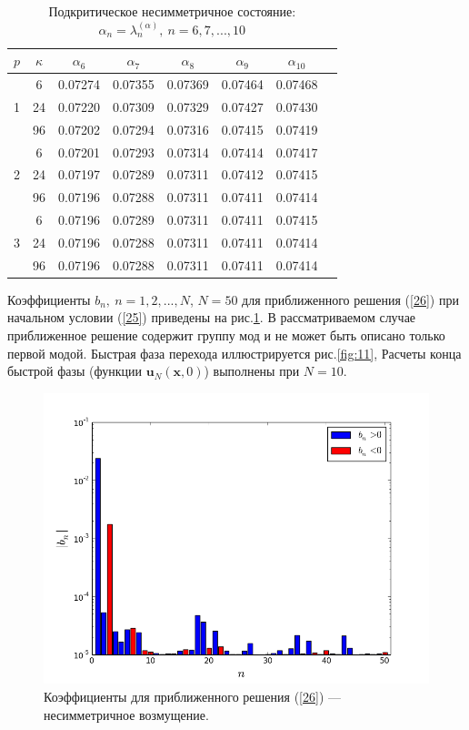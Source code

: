 \documentclass[authoryear]{elsarticle}
\begin{document}
\begin{table}[h]
\caption{Подкритическое несимметричное состояние:  $\alpha_n = \lambda_n^{(\alpha )}, \ n = 6,7, ..., 10$}
\label{t-9}
\begin{center}
\begin{tabular}{cccccccc}
\hline
$p$ & $\kappa$ & $\alpha_6$ &  $\alpha_7$ & $\alpha_8$ &  $\alpha_9$ & $\alpha_{10}$ \\  
\hline
   & 6 & 0.07274 & 0.07355 & 0.07369 & 0.07464 & 0.07468 \\ 
1 & 24 & 0.07220 & 0.07309 & 0.07329 & 0.07427 & 0.07430 \\
  & 96 & 0.07202 & 0.07294 & 0.07316 & 0.07415 & 0.07419 \\ 
\hline
   & 6 & 0.07201 & 0.07293 & 0.07314 & 0.07414 & 0.07417 \\
2 & 24 & 0.07197 & 0.07289 & 0.07311 & 0.07412 & 0.07415 \\ 
  & 96 & 0.07196 & 0.07288 & 0.07311 & 0.07411 & 0.07414 \\ 
\hline
   & 6 & 0.07196 & 0.07289 & 0.07311 & 0.07411 & 0.07415 \\ 
3 & 24 & 0.07196 & 0.07288 & 0.07311 & 0.07411 & 0.07414 \\ 
  & 96 & 0.07196 & 0.07288 & 0.07311 & 0.07411 & 0.07414 \\ 
\hline
\end{tabular}
\end{center}
\end{table}

Коэффициенты $b_n, \ n = 1,2, ..., N$, $N=50$ для приближенного
решения (\ref{26}) при начальном условии (\ref{25}) приведены на рис.\ref{fig:12}. 
В рассматриваемом случае приближенное решение содержит группу мод и не может быть
описано только первой модой. Быстрая фаза перехода иллюстрируется рис.\ref{fig:11},
Расчеты конца быстрой фазы (функции $\bm u_N(\bm x, 0)$) выполнены при 
$N=10$. 

\begin{figure}[!h]
  \begin{center}
    \includegraphics[width=0.95\linewidth] {12.png}
	\caption{Коэффициенты для приближенного решения (\ref{26}) --- несимметричное возмущение.}
	\label{fig:12}
  \end{center}
\end{figure} 
\end{document}
